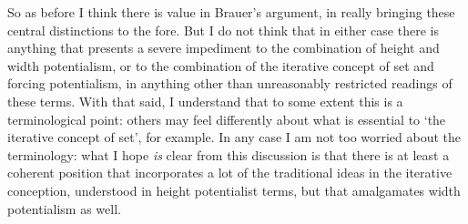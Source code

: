 \documentclass{article}
\begin{document}
So as before I think there is value in Brauer's argument, in really bringing these 
central distinctions to the fore. But I do not think that in either case there 
is anything that presents a severe impediment to the combination of height and width 
potentialism, or to the combination of the iterative concept of set and forcing potentialism,
in anything other than unreasonably restricted readings of these terms. With that said,
I understand that to some extent this is a terminological point: others may 
feel differently about what is essential to `the iterative concept of set', for example.
In any case I am not too worried about the terminology: what I hope \emph{is} clear 
from this discussion is that there is 
at least a coherent 
position that incorporates a lot of the traditional ideas in the 
iterative conception, understood in height potentialist terms, but that amalgamates 
width potentialism as well. 
\end{document}
